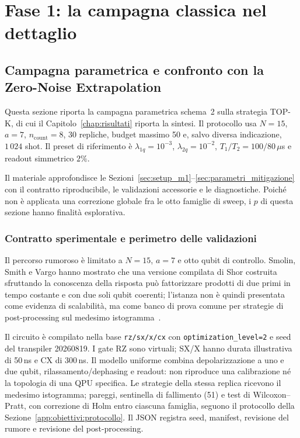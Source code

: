 \chapter{Fase 1: la campagna classica nel dettaglio}
\captionsetup[figure]{font=small,labelfont=bf}
\label{app:fase1}

\section{Campagna parametrica e confronto con la Zero-Noise Extrapolation}
\label{app:parametrica}
\begin{onehalfspace}

Questa sezione riporta la campagna parametrica schema~2 sulla
strategia TOP-K, di cui il Capitolo~\ref{chap:risultati} riporta la sintesi. Il protocollo usa $N=15$, $a=7$,
$n_{\mathrm{count}}=8$, 30 repliche, budget massimo 50 e, salvo diversa
indicazione, $1\,024$ shot. Il preset di riferimento è
$\lambda_{1q}=10^{-3}$, $\lambda_{2q}=10^{-2}$,
$T_1/T_2=100/80\,\mu$s e readout simmetrico $2\%$.

Il materiale approfondisce le Sezioni~\ref{sec:setup_m1}--\ref{sec:parametri_mitigazione}
con il contratto riproducibile, le validazioni accessorie e le diagnostiche. Poiché non è
applicata una correzione globale fra le otto famiglie di sweep, i $p$ di questa sezione
hanno finalità esplorativa.

\subsection{Contratto sperimentale e perimetro delle validazioni}
\label{app:fase1_contratto}

Il percorso rumoroso è limitato a $N=15$, $a=7$ e otto qubit di
controllo. Smolin, Smith e Vargo hanno mostrato che una versione compilata
di Shor costruita sfruttando la conoscenza della risposta può fattorizzare
prodotti di due primi in tempo costante e con due soli qubit coerenti;
l'istanza non è quindi presentata come evidenza di scalabilità, ma come
banco di prova comune per strategie di post-processing sul medesimo
istogramma~\cite{smolin2013}.

Il circuito è compilato nella base \texttt{rz/sx/x/cx} con
\texttt{optimization\_level=2} e seed del transpiler 20260819. I gate RZ
sono virtuali; SX/X hanno durata illustrativa di 50\,ns e CX di 300\,ns.
Il modello uniforme combina depolarizzazione a uno e due qubit,
rilassamento/dephasing e readout: non riproduce una calibrazione né la
topologia di una QPU specifica. Le strategie della stessa replica ricevono il
medesimo istogramma; pareggi, sentinella di fallimento (51) e test di Wilcoxon--Pratt,
con correzione di Holm entro ciascuna famiglia, seguono il protocollo della
Sezione~\ref{app:obiettivi:protocollo}. Il JSON registra seed, manifest, revisione del
rumore e revisione del post-processing.


\end{onehalfspace}

